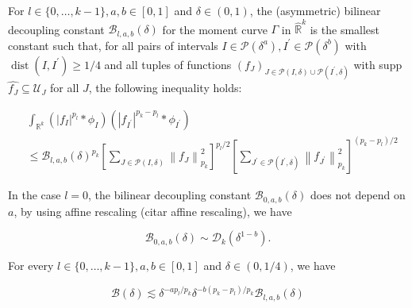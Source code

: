 \begin{defn}\label{def:assymetric}
     For $l \in\{0, \ldots, k-1\}, a, b \in[0,1]$ and $\delta \in(0,1)$, 
     the (asymmetric) bilinear decoupling constant $\mathcal{B}_{l, a, b}(\delta)$ for the moment curve 
     $\Gamma$ in $\hat{\mathbb{R}}^{k}$ is the smallest constant such that, 
     for all pairs of intervals $I \in \mathcal{P}\left(\delta^{a}\right), I^{\prime} \in \mathcal{P}\left(\delta^{b}\right)$
      with $\operatorname{dist}\left(I, I^{\prime}\right) \geqslant 1 / 4$ and all tuples of functions 
      $\left(f_{J}\right)_{J \in \mathcal{P}(I, \delta) \cup \mathcal{P}\left(I^{\prime}, \delta\right)}$
       with supp $\widehat{f_{J}} \subseteq \mathcal{U}_{J}$ for all $J$, the following inequality holds:


\begin{align*}
& \int_{\mathbb{R}^{k}}\left(\left|f_{I}\right|^{p_{l}} * \phi_{I}\right)\left(\left|f_{I^{\prime}}\right|^{p_{k}-p_{l}} * \phi_{I^{\prime}}\right) \\
& \leqslant \mathcal{B}_{l, a, b}(\delta)^{p_{k}}\left[\sum_{J \in \mathcal{P}(I, \delta)}\left\|f_{J}\right\|_{p_{k}}^{2}\right]^{p_{l} / 2}\left[\sum_{J^{\prime} \in \mathcal{P}\left(I^{\prime}, \delta\right)}\left\|f_{J^{\prime}}\right\|_{p_{k}}^{2}\right]^{\left(p_{k}-p_{l}\right) / 2} 
\end{align*}

\end{defn}

\begin{rmk}
     In the case $l=0$, the bilinear decoupling constant $\mathcal{B}_{0, a, b}(\delta)$  does not depend on $a$, by using affine rescaling (citar affine rescaling), we have


\begin{equation*}
\mathcal{B}_{0, a, b}(\delta) \sim \mathcal{D}_{k}\left(\delta^{1-b}\right).
\end{equation*}

\end{rmk}

\begin{lem}\label{lem:sym.to.asym.}
For every $l \in\{0, \ldots, k-1\}, a, b \in[0,1]$ and $\delta \in(0,1 / 4)$, we have

\begin{equation*}
\mathcal{B}(\delta) \lesssim \delta^{-a p_{l} / p_{k}} \delta^{-b\left(p_{k}-p_{l}\right) / p_{k}} \mathcal{B}_{l, a, b}(\delta) \tag{3.4}
\end{equation*}

\end{lem}

